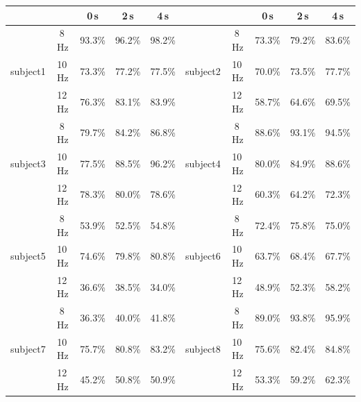 \documentclass[smallextended]{svjour3}
\begin{document}
\begin{table}[ht]
\begin{center}
    \begin{tabular}{ r | c | c | c | c || r | c | c | c | c }
        \multicolumn{2}{c|}{} & 0\,s & 2\,s & 4\,s & \multicolumn{2}{c|}{} & 0\,s & 2\,s & 4\,s \\ \hline

        \multirow{3}{*}{subject1} &  8\,Hz & 93.3\% & 96.2\% & 98.2\% & \multirow{3}{*}{subject2} &  8\,Hz & 73.3\% & 79.2\% & 83.6\% \\
                                  & 10\,Hz & 73.3\% & 77.2\% & 77.5\% & & 10\,Hz & 70.0\% & 73.5\% & 77.7\% \\
                                  & 12\,Hz & 76.3\% & 83.1\% & 83.9\% & & 12\,Hz & 58.7\% & 64.6\% & 69.5\% \\
         
        \hline

        \multirow{3}{*}{subject3} &  8\,Hz & 79.7\% & 84.2\% & 86.8\% & \multirow{3}{*}{subject4} &  8\,Hz & 88.6\% & 93.1\% & 94.5\% \\
                                  & 10\,Hz & 77.5\% & 88.5\% & 96.2\% & & 10\,Hz & 80.0\% & 84.9\% & 88.6\% \\
                                  & 12\,Hz & 78.3\% & 80.0\% & 78.6\% & & 12\,Hz & 60.3\% & 64.2\% & 72.3\% \\
        
        \hline

        \multirow{3}{*}{subject5} &  8\,Hz & 53.9\% & 52.5\% & 54.8\% &  \multirow{3}{*}{subject6} &  8\,Hz & 72.4\% & 75.8\% & 75.0\% \\
                                  & 10\,Hz & 74.6\% & 79.8\% & 80.8\% & & 10\,Hz & 63.7\% & 68.4\% & 67.7\% \\
                                  & 12\,Hz & 36.6\% & 38.5\% & 34.0\% & & 12\,Hz & 48.9\% & 52.3\% & 58.2\% \\

        \hline

        \multirow{3}{*}{subject7} &  8\,Hz & 36.3\% & 40.0\% & 41.8\% & \multirow{3}{*}{subject8} &  8\,Hz & 89.0\% & 93.8\% & 95.9\% \\
                                  & 10\,Hz & 75.7\% & 80.8\% & 83.2\% & & 10\,Hz & 75.6\% & 82.4\% & 84.8\% \\
                                  & 12\,Hz & 45.2\% & 50.8\% & 50.9\% & & 12\,Hz & 53.3\% & 59.2\% & 62.3\% \\


\end{tabular}
\end{center}
\end{table}
\end{document}
